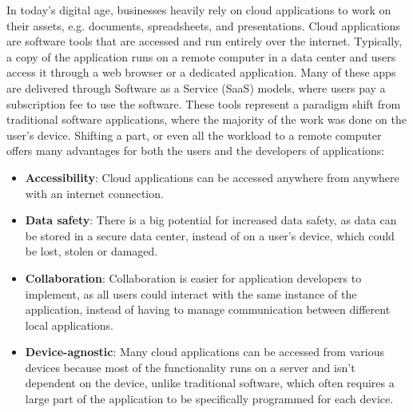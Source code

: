 In today's digital age, businesses heavily rely on cloud applications
to work on their assets, e.g. documents, spreadsheets, and presentations.
Cloud applications are software tools that are accessed and run entirely over the internet.
Typically, a copy of the application runs on a remote computer in a data center and %
users access it through a web browser or a dedicated application.
Many of these apps are delivered through Software as a Service (SaaS) models,
where users pay a subscription fee to use the software.
These tools represent a paradigm shift from traditional software applications,
where the majority of the work was done on the user's device.
Shifting a part, or even all the workload to a remote computer offers many advantages
for both the users and the developers of applications:
%
\begin{itemize}
  \item \textbf{Accessibility}: Cloud applications can be accessed anywhere from anywhere with an internet connection.

  \item \textbf{Data safety}: There is a big potential for increased data safety, as data can be
	      stored in a secure data center, instead of on a user's device, which could be lost, stolen or damaged.

      \item \textbf{Collaboration}: Collaboration is easier for application developers to implement, as
	      all users could interact with the same instance of the application, instead
	      of having to manage communication between different local applications.

      \item \textbf{Device-agnostic}: Many cloud applications can be accessed from various devices because most
	      of the functionality runs on a server and isn't dependent on the device, unlike
	      traditional software, which often requires a large part of the application to be
	      specifically programmed for each device.


\end{itemize}
